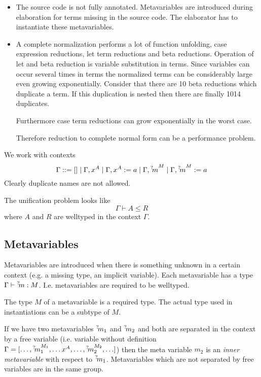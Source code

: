 \begin{itemize}

    \item The source code is not fully annotated. Metavariables are introduced
        during elaboration for terms missing in the source code. The elaborator
        has to instantiate these metavariables.

    \item A complete normalization performs a lot of function unfolding, case
        expression reductions, let term reductions and beta reductions.
        Operation of let and beta reduction is variable substitution in terms.
        Since variables can occur several times in terms the normalized terms
        can be considerably large even growing exponentially. Consider that
        there are 10 beta reductions which duplicate a term. If this duplication
        is nested then there are finally 1014 duplicates.

        Furthermore case term reductions can grow exponentially in the worst
        case.

        Therefore reduction to complete normal form can be a performance
        problem.
\end{itemize}


We work with contexts
$$
    \Gamma ::= [] \mid \Gamma,x^A \mid \Gamma, x^A := a \mid \Gamma, {{}^? \kern-0.2em m}^M
                \mid \Gamma, {{}^? \kern-0.2em m}^M := a
$$
Clearly duplicate names are not allowed.

The unification problem looks like
$$
\Gamma \vdash A \le R
$$
where $A$ and $R$ are welltyped in the context $\Gamma$.





\subsection{Metavariables}


Metavariables are introduced when there is something unknown in a certain
context (e.g. a missing type, an implicit variable). Each metavariable has a
type $\Gamma \vdash {{}^? \kern-0.2em m} : M$. I.e. metavariables are required to be
welltyped.

The type $M$ of a metavariable is a required type. The actual type used in
instantiations can be a subtype of $M$.

If we have two metavariables ${{}^? \kern-0.2em m}_1$ and ${{}^? \kern-0.2em m}_2$ and both are separated
in the context by a free variable (i.e. variable without definition $\Gamma = [
    \ldots, {{}^? \kern-0.2em m}_1^{M_1}, \ldots x^A, \ldots, {{}^? \kern-0.2em m}_2^{M_2}, \ldots]$) then
the meta variable $m_2$ is an \emph{inner metavariable} with respect to ${{}^? \kern-0.2em m}_1$. Metavariables which are not separated by free variables are in the same
group.

